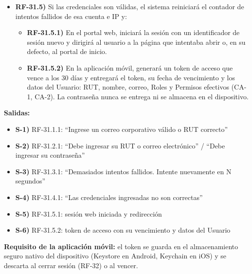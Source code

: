 \begin{itemize}[label={}, leftmargin=1.5em]
  \begin{itemize}[label={}, leftmargin=1.5em]
    \item \textbf{RF-31.4.1)} Si la cuenta no existe o la contrase\~na no corresponde, se notificar\'a: ``Las credenciales ingresadas no son correctas'' y se sumar\'a un intento fallido. El mensaje y el tiempo de respuesta son los mismos en ambos casos, para no revelar qu\'e cuentas existen.
  \end{itemize}
  \item \textbf{RF-31.5)} Si las credenciales son v\'alidas, el sistema reiniciar\'a el contador de intentos fallidos de esa cuenta e IP y:
  \begin{itemize}[label={}, leftmargin=1.5em]
    \item \textbf{RF-31.5.1)} En el portal web, iniciar\'a la sesi\'on con un identificador de sesi\'on nuevo y dirigir\'a al usuario a la p\'agina que intentaba abrir o, en su defecto, al portal de inicio.
    \item \textbf{RF-31.5.2)} En la aplicaci\'on m\'ovil, generar\'a un token de acceso que vence a los 30 d\'ias y entregar\'a el token, su fecha de vencimiento y los datos del Usuario: RUT, nombre, correo, Roles y Permisos efectivos (CA-1, CA-2). La contrase\~na nunca se entrega ni se almacena en el dispositivo.
  \end{itemize}
\end{itemize}

\textbf{Salidas:}
\begin{itemize}[label={}, leftmargin=1.5em]
  \item \textbf{S-1)} RF-31.1.1: ``Ingrese un correo corporativo v\'alido o RUT correcto''
  \item \textbf{S-2)} RF-31.2.1: ``Debe ingresar su RUT o correo electr\'onico'' / ``Debe ingresar su contrase\~na''
  \item \textbf{S-3)} RF-31.3.1: ``Demasiados intentos fallidos. Intente nuevamente en N segundos''
  \item \textbf{S-4)} RF-31.4.1: ``Las credenciales ingresadas no son correctas''
  \item \textbf{S-5)} RF-31.5.1: sesi\'on web iniciada y redirecci\'on
  \item \textbf{S-6)} RF-31.5.2: token de acceso con su vencimiento y datos del Usuario
\end{itemize}

\textbf{Requisito de la aplicaci\'on m\'ovil:} el token se guarda en el almacenamiento seguro nativo del dispositivo (Keystore en Android, Keychain en iOS) y se descarta al cerrar sesi\'on (RF-32) o al vencer.

